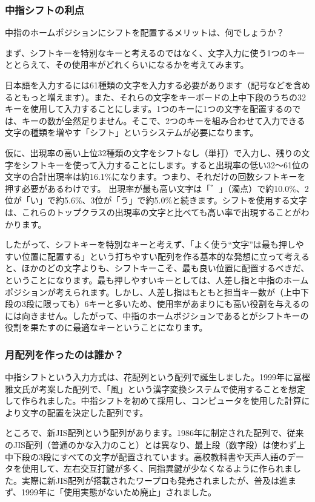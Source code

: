 \subsubsection*{中指シフトの利点}

中指のホームポジションにシフトを配置するメリットは、何でしょうか？

まず、シフトキーを特別なキーと考えるのではなく、文字入力に使う1つのキーととらえて、その使用率がどれくらいになるかを考えてみます。

日本語を入力するには61種類の文字を入力する必要があります（記号などを含めるともっと増えます）。また、それらの文字をキーボードの上中下段のうちの32キーを使用して入力することにします。1つのキーに1つの文字を配置するのでは、キーの数が全然足りません。そこで、2つのキーを組み合わせて入力できる文字の種類を増やす「シフト」というシステムが必要になります。

仮に、出現率の高い上位32種類の文字をシフトなし（単打）で入力し、残りの文字をシフトキーを使って入力することにします。すると出現率の低い32～61位の文字の合計出現率は約16.1\%になります。つまり、それだけの回数シフトキーを押す必要があるわけです。
出現率が最も高い文字は「゛」（濁点）で約10.0\%、2位が「い」で約5.6\%、3位が「う」で約5.0\%と続きます。シフトを使用する文字は、これらのトップクラスの出現率の文字と比べても高い率で出現することがわかります。

したがって、シフトキーを特別なキーと考えず、「よく使う“文字”は最も押しやすい位置に配置する」という打ちやすい配列を作る基本的な発想に立って考えると、ほかのどの文字よりも、シフトキーこそ、最も良い位置に配置するべきだ、ということになります。最も押しやすいキーとしては、人差し指と中指のホームポジションが考えられます。しかし、人差し指はもともと担当キー数が（上中下段の3段に限っても）6キーと多いため、使用率があまりにも高い役割を与えるのには向きません。したがって、中指のホームポジションであるとがシフトキーの役割を果たすのに最適なキーということになります。

\subsubsection*{月配列を作ったのは誰か？}

中指シフトという入力方式は、花配列という配列で誕生しました。1999年に冨樫雅文氏が考案した配列で、「風」という漢字変換システムで使用することを想定して作られました。中指シフトを初めて採用し、コンピュータを使用した計算により文字の配置を決定した配列です。

ところで、新JIS配列という配列があります。1986年に制定された配列で、従来のJIS配列（普通のかな入力のこと）とは異なり、最上段（数字段）は使わず上中下段の3段にすべての文字が配置されています。高校教科書や天声人語のデータを使用して、左右交互打鍵が多く、同指異鍵が少なくなるように作られました。実際に新JIS配列が搭載されたワープロも発売されましたが、普及は進まず、1999年に「使用実態がないため廃止」されました。

